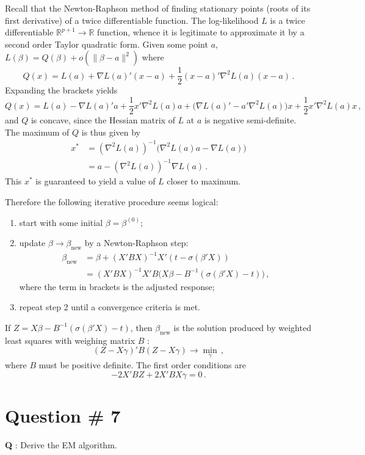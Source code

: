 \documentclass[a4paper]{article}
\newcommand{\Real}{\mathbb{R}}
\begin{document}
Recall that the Newton-Raphson method of finding stationary points (roots of its
first derivative) of a twice differentiable function. The log-likelihood $L$ is
a twice differentiable $\Real^{p+1}\to\Real$ function, whence it is legitimate
to approximate it by a second order Taylor quadratic form. Given some point $a$,
$L(\beta) = Q(\beta) + o(\|\beta-a\|^2)$ where
\[ Q(x) = L(a) + \nabla L(a)'(x-a) + \frac{1}{2}(x-a)'\nabla^2 L(a) (x-a)\,. \]
Expanding the brackets yields
\[
Q(x) = L(a) - \nabla L(a)'a + \frac{1}{2}x'\nabla^2 L(a) a
	+ \bigl( \nabla L(a)' - a'\nabla^2 L(a) \bigr)x
	+ \frac{1}{2}x'\nabla^2 L(a) x\,,
\]
and $Q$ is concave, since the Hessian matrix of $L$ at $a$ is negative semi-definite.
The maximum of $Q$ is thus given by
\begin{align*}
	x^*
	&= (\nabla^2 L(a))^{-1} \bigl( \nabla^2 L(a) a - \nabla L(a)\bigl) \\
	&= a - (\nabla^2 L(a))^{-1}\nabla L(a) \,.
\end{align*}
This $x^*$ is guaranteed to yield a value of $L$ closer to maximum.

Therefore the following iterative procedure seems logical: \begin{enumerate}
	\item start with some initial $\beta = \beta^{(0)}$;
	\item update $\beta \to \beta_{\text{new}}$ by a Newton-Raphson step:
	\begin{align*}
		\beta_{\text{new}}
		&= \beta + (X'BX)^{-1} X'( t - \sigma(\beta'X) ) \\
		&= (X'BX)^{-1} X'B \bigl( X \beta - B^{-1}( \sigma(\beta'X) - t ) \bigr) \,,
	\end{align*}
	where the term in brackets is the adjusted response;
	\item repeat step 2 until a convergence criteria is met.
\end{enumerate}
If $Z = X \beta - B^{-1}( \sigma(\beta'X) - t )$, then $\beta_{\text{new}}$ is the
solution produced by weighted least squares with weighing matrix $B$ :
\[ ( Z - X\gamma )'B (Z - X\gamma ) \to \min_\gamma \,, \]
where $B$ must be positive definite. The first order conditions are
\[ - 2 X'BZ + 2 X'BX \gamma = 0 \,. \]

\clearpage

\section[EM]{Question \# 7} %
\label{sec:question_7}
\textbf{\large \textbf{Q}} : Derive the EM algorithm.
\end{document}

